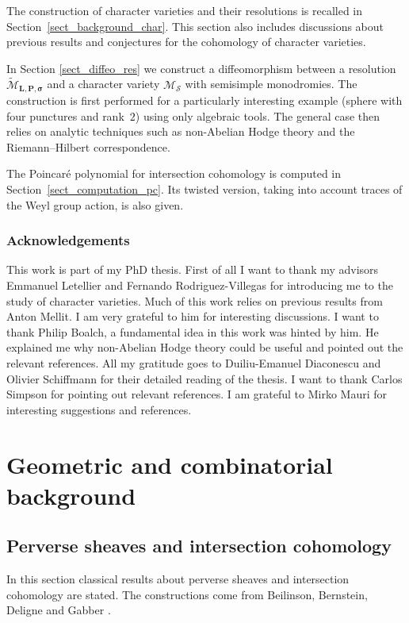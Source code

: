 \documentclass[11pt]{article}
\theoremstyle{definition}
\theoremstyle{plain}
\newcommand{\mlps}{\widetilde{\mathcal{M}}_{\boldsymbol{L},\boldsymbol{P},\boldsymbol{\sigma}}}
\begin{document}
The construction of character varieties and their resolutions is recalled in Section~\ref{sect_background_char}. This section also includes discussions about previous results and conjectures for the cohomology of character varieties.

In Section \ref{sect_diffeo_res} we construct a diffeomorphism between a resolution $\mlps$ and a character variety $\mathcal{M}_{\boldsymbol{\mathcal{S}}}$ with semisimple monodromies. The construction is first performed for a particularly interesting example (sphere with four punctures and rank~$2$) using only algebraic tools. The general case then relies on analytic techniques such as non-Abelian Hodge theory and the Riemann--Hilbert correspondence.

The Poincaré polynomial for intersection cohomology is computed in Section~\ref{sect_computation_pc}. Its twisted version, taking into account traces of the Weyl group action, is also given.

\subsubsection*{Acknowledgements}

This work is part of my PhD thesis. First of all I want to thank my advisors Emmanuel Letellier and Fernando Rodriguez-Villegas for introducing me to the study of character varieties. Much of this work relies on previous results from Anton Mellit. I am very grateful to him for interesting discussions. I want to thank Philip Boalch, a fundamental idea in this work was hinted by him. He explained me why non-Abelian Hodge theory could be useful and pointed out the relevant references. All my gratitude goes to Duiliu-Emanuel Diaconescu and Olivier Schiffmann for their detailed reading of the thesis. I want to thank Carlos Simpson for pointing out relevant references. I am grateful to Mirko Mauri for interesting suggestions and references.

\section{Geometric and combinatorial background}\label{sect_background}
\subsection{Perverse sheaves and intersection cohomology}\label{sect_perv_ic}
In this section classical results about perverse sheaves and intersection cohomology are stated. The constructions come from Beilinson, Bernstein, Deligne and Gabber \cite{Beilinson_Bernstein_Deligne_Gabber}.
\end{document}

